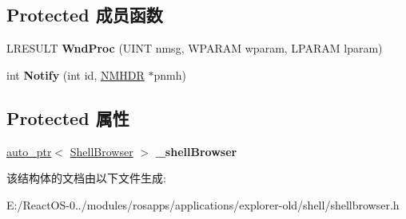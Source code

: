 \subsection*{Protected 成员函数}
\begin{DoxyCompactItemize}
\item 
\mbox{\label{struct_shell_browser_child_t_a3503bd20d390560db0e071d6d7479292}} 
L\+R\+E\+S\+U\+LT {\bfseries Wnd\+Proc} (U\+I\+NT nmsg, W\+P\+A\+R\+AM wparam, L\+P\+A\+R\+AM lparam)
\item 
\mbox{\label{struct_shell_browser_child_t_a67d6cc4f9683ae812ea1ac51b4e820b5}} 
int {\bfseries Notify} (int id, \hyperlink{structtag_n_m_h_d_r}{N\+M\+H\+DR} $\ast$pnmh)
\end{DoxyCompactItemize}
\subsection*{Protected 属性}
\begin{DoxyCompactItemize}
\item 
\mbox{\label{struct_shell_browser_child_t_ab8bf4bd92f1a86213638a498732c0d8d}} 
\hyperlink{classauto__ptr}{auto\+\_\+ptr}$<$ \hyperlink{struct_shell_browser}{Shell\+Browser} $>$ {\bfseries \+\_\+shell\+Browser}
\end{DoxyCompactItemize}


该结构体的文档由以下文件生成\+:\begin{DoxyCompactItemize}
\item 
E\+:/\+React\+O\+S-\/0../modules/rosapps/applications/explorer-\/old/shell/shellbrowser.\+h\end{DoxyCompactItemize}
